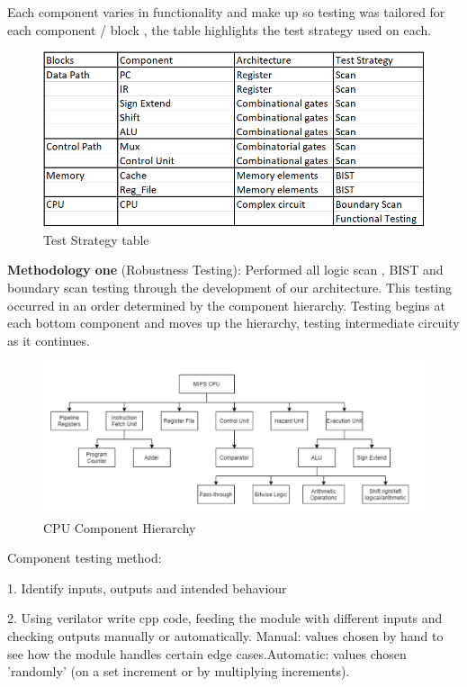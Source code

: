 \documentclass[10pt]{datasheet}
\begin{document}
Each component varies in functionality and make up so testing was tailored for each component / block , the table highlights the test strategy used on each.

\begin{figure}[h]
    \includegraphics[scale=0.7]{Assets/Strategy.PNG}
    \captionsetup{justification=centering}
    \caption{Test Strategy table}
\end{figure}

\smallbreak


\textbf{Methodology one} (Robustness Testing): Performed all logic scan , BIST and boundary scan testing through the development of our architecture. This testing occurred in an order determined by the component hierarchy. Testing begins at each bottom component and moves up the hierarchy, testing intermediate circuity as it continues. 
\smallbreak

\begin{figure}[h]
    \includegraphics[scale=0.45]{Assets/hierarchy2.png}
    \captionsetup{justification=centering}
    \caption{CPU Component Hierarchy}
\end{figure}

\smallbreak

Component testing method:

1. Identify inputs, outputs and intended behaviour

2. Using verilator write cpp code, feeding the module with different inputs and checking outputs manually or automatically.
Manual: values chosen by hand to see how the module handles certain edge cases.Automatic: values chosen 'randomly' (on a set increment or by multiplying increments).
\end{document}
